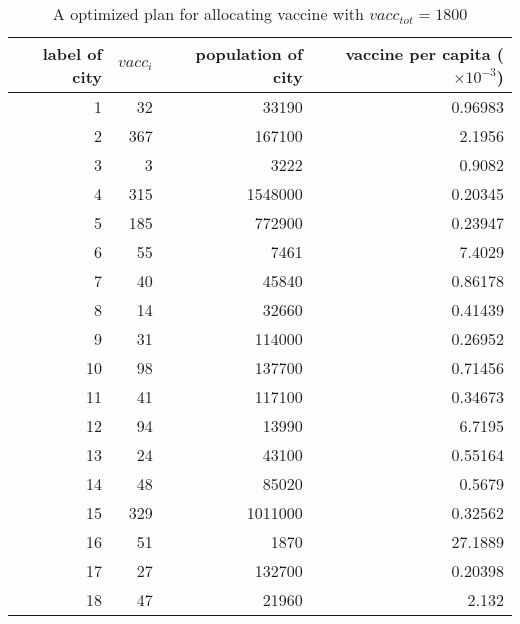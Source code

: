 \begin{table}[]
	\centering
	\begin{tabular}{|r|r|r|r|}
		\hline
		label of city & $vacc_i$ & population of city & vaccine per capita ($\times 10^{-3}$) \\ \hline
		1             & 32       & 33190              & 0.96983                               \\ \hline
		2             & 367      & 167100             & 2.1956                                \\ \hline
		3             & 3        & 3222               & 0.9082                                \\ \hline
		4             & 315      & 1548000            & 0.20345                               \\ \hline
		5             & 185      & 772900             & 0.23947                               \\ \hline
		6             & 55       & 7461               & 7.4029                                \\ \hline
		7             & 40       & 45840              & 0.86178                               \\ \hline
		8             & 14       & 32660              & 0.41439                               \\ \hline
		9             & 31       & 114000             & 0.26952                               \\ \hline
		10            & 98       & 137700             & 0.71456                               \\ \hline
		11            & 41       & 117100             & 0.34673                               \\ \hline
		12            & 94       & 13990              & 6.7195                                \\ \hline
		13            & 24       & 43100              & 0.55164                               \\ \hline
		14            & 48       & 85020              & 0.5679                                \\ \hline
		15            & 329      & 1011000            & 0.32562                               \\ \hline
		16            & 51       & 1870               & 27.1889                               \\ \hline
		17            & 27       & 132700             & 0.20398                               \\ \hline
		18            & 47       & 21960              & 2.132                                 \\ \hline
	\end{tabular}
	\caption{A optimized plan for allocating vaccine with $vacc_{tot} = 1800$ }
	\label{result}
\end{table}

